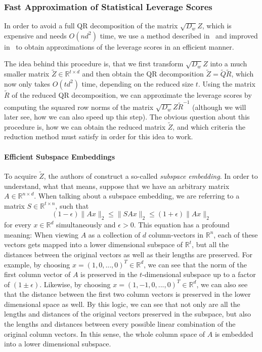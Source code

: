 \subsubsection{Fast Approximation of Statistical Leverage Scores}

In order to avoid a full QR decomposition of
the matrix $\sqrt{D_w}Z$, which is expensive
and needs $O(nd^2)$ time, we use a method
described in~\cite{leverage-scores-drineas} and improved
in~\cite{woodruff-2017} to obtain approximations of the
leverage scores in an efficient manner.

The idea behind this procedure is,
that we first transform $\sqrt{D_w}Z$ into a
much smaller matrix $\tilde Z \in \mathbb{R}^{t \times d}$
and then obtain the QR decomposition $\tilde{Z} = \tilde Q \tilde R$,
which now only takes $O(td^2)$ time, depending on the
reduced size $t$.
Using the matrix $\tilde{R}$ of the reduced QR decomposition, we
can approximate the leverage scores by computing the squared row norms of
the matrix $\sqrt{D_w}Z \tilde{R}^{-1}$ (although we will later
see, how we can also speed up this step).
The obvious question about this procedure is, how we can obtain
the reduced matrix $\tilde{Z}$, and which criteria the
reduction method must satisfy in order for this idea to work.

\paragraph{Efficient Subspace Embeddings}

To acquire $\tilde{Z}$, the authors of \cite{woodruff-2017} construct
a so-called \textit{subspace embedding}.
In order to understand, what that means, suppose that we have an
arbitrary matrix $A \in \mathbb{R}^{n \times d}$.
When talking about a subspace embedding, we are referring to a matrix
$S \in \mathbb{R}^{t \times n}$, such that
\begin{equation*}
    (1 - \epsilon) \lVert Ax \rVert_2 \leq \lVert SAx \rVert_2
    \leq (1 + \epsilon) \lVert Ax \rVert_2
\end{equation*}
for every $x \in \mathbb{R}^d$ simultaneously and $\epsilon > 0$.
This equation has a profound meaning: When viewing $A$ as a
collection of
$d$ column-vectors in $\mathbb{R}^n$, each of these vectors gets
mapped into a lower dimensional subspace of $\mathbb{R}^t$, but all the
distances between the original vectors as well as their lengths
are preserved. For example, by choosing
$x = (1, 0, ..., 0)^T \in \mathbb{R}^d$, we can see that the norm
of the first column vector of $A$ is preserved in the
$t$-dimensional subspace up to a factor of $(1 \pm \epsilon)$.
Likewise, by choosing $x = (1, -1, 0, ..., 0)^T \in \mathbb{R}^d$,
we can also see that the distance between the first two column
vectors is preserved in the lower dimensional space as well.
By this logic, we can see that not only are all the lengths
and distances of the original vectors preserved in the
subspace, but also
the lengths and distances between every possible linear
combination of the original column vectors. In this sense, the
whole column space of $A$ is embedded into a lower dimensional
subspace.

